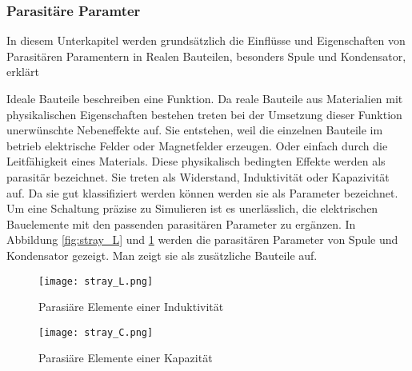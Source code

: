 \subsubsection{Parasitäre Paramter}\label{subsec:parasitparam}
In diesem Unterkapitel werden grundsätzlich die Einflüsse und Eigenschaften von Parasitären Paramentern in Realen Bauteilen, besonders Spule und Kondensator, erklärt

Ideale Bauteile beschreiben eine Funktion. Da reale Bauteile aus Materialien mit physikalischen Eigenschaften bestehen treten bei der Umsetzung dieser Funktion unerwünschte Nebeneffekte auf. Sie entstehen, weil die einzelnen Bauteile im betrieb elektrische Felder oder Magnetfelder erzeugen. Oder einfach durch die Leitfähigkeit eines Materials. Diese physikalisch bedingten Effekte werden als parasitär bezeichnet. Sie treten als Widerstand, Induktivität oder Kapazivität auf. Da sie gut klassifiziert werden können werden sie als Parameter bezeichnet. 
Um eine Schaltung präzise zu Simulieren ist es unerlässlich, die elektrischen Bauelemente mit den passenden parasitären Parameter zu ergänzen. In Abbildung \ref{fig:stray_L} und \ref{fig:stray_C} werden die parasitären Parameter von Spule und Kondensator gezeigt. Man zeigt sie als zusätzliche Bauteile auf.


\begin{figure}[H]
	\begin{minipage}[h]{0.45\linewidth}
		\centering
		\texttt{[image: stray\_L.png]}
		\label{fig:stray_L}
		\caption{Parasiäre Elemente einer Induktivität \cite{aufgabenstellung}}
	\end{minipage}
	\begin{minipage}[h]{0.45\linewidth}
		\centering
		\texttt{[image: stray\_C.png]}
		\label{fig:stray_C}
		\caption{Parasiäre Elemente einer Kapazität \cite{aufgabenstellung}}
	\end{minipage}
\end{figure}

